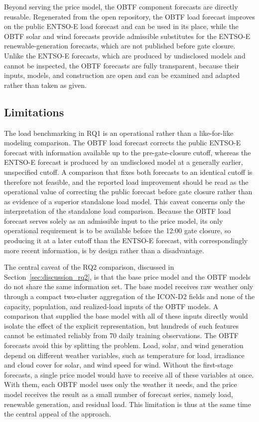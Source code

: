Beyond serving the price model, the OBTF component forecasts are
directly reusable. Regenerated from the open repository, the OBTF load forecast improves on the public \mbox{ENTSO-E} load forecast and can be used in its place,
while the OBTF solar and wind forecasts provide admissible substitutes for the
\mbox{ENTSO-E} renewable-generation forecasts, which are not published before
gate closure. Unlike the \mbox{ENTSO-E} forecasts, which are produced by
undisclosed models and cannot be inspected, the OBTF forecasts are
fully transparent, because their inputs, models, and construction are open and
can be examined and adapted rather than taken as given.

\subsection{Limitations}
\label{sec:limitations}

The load benchmarking in RQ1 is an operational rather than a like-for-like
modeling comparison. The OBTF load forecast corrects the public
\mbox{ENTSO-E} forecast with information available up to the pre-gate-closure
cutoff, whereas the \mbox{ENTSO-E} forecast is produced by an undisclosed model
at a generally earlier, unspecified cutoff. A comparison that fixes both
forecasts to an identical cutoff is therefore not feasible, and the reported load
improvement should be read as the operational value of correcting the public
forecast before gate closure rather than as evidence of a superior standalone
load model. This caveat concerns only the interpretation of the standalone load
comparison. Because the OBTF load forecast serves solely as an admissible input to the
price model, its only operational requirement is to be available before the 12:00
gate closure, so producing it at a later cutoff than the \mbox{ENTSO-E} forecast,
with correspondingly more recent information, is by design rather than a
disadvantage.

The central caveat of the RQ2 comparison, discussed in
Section~\ref{sec:discussion_rq2}, is that the base price model and the OBTF models do
not share the same information set. The base model receives raw weather only
through a compact two-cluster aggregation of the \mbox{ICON-D2} fields and none
of the capacity, population, and realized-load inputs of the OBTF models. A
comparison that supplied the base model with all of these inputs directly would
isolate the effect of the explicit representation, but hundreds of such features
cannot be estimated reliably from 70 daily training observations. The OBTF forecasts avoid this by splitting the
problem. Load, solar, and wind generation depend on different weather
variables, such as temperature for load, irradiance and cloud cover for solar,
and wind speed for wind. Without the first-stage forecasts, a single price model
would have to receive all of these variables at once. With them, each OBTF model uses only the weather it needs, and the price model receives the result as
a small number of forecast series, namely load, renewable generation, and
residual load. This limitation is thus at the same time the central appeal of
the approach.

